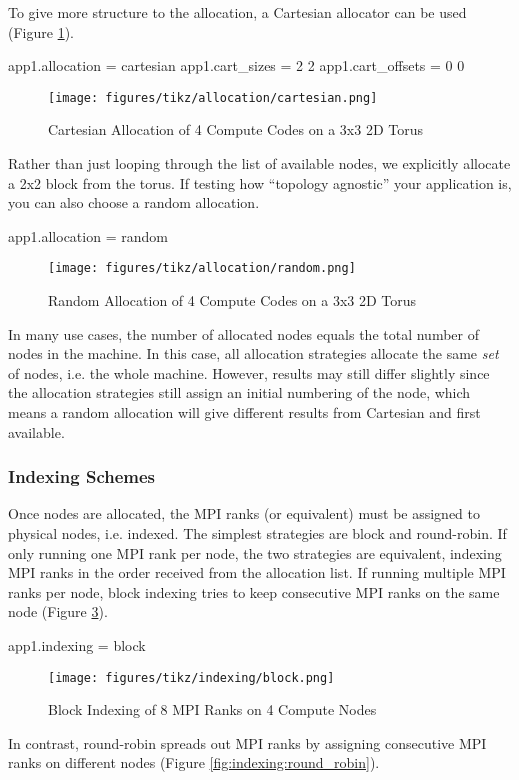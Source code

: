 To give more structure to the allocation, a Cartesian allocator can be used (Figure \ref{fig:allocation:cartesian}).

\begin{ViFile}
app1.allocation = cartesian
app1.cart_sizes = 2 2
app1.cart_offsets = 0 0
\end{ViFile}
\begin{figure}[h]
\centering
\texttt{[image: figures/tikz/allocation/cartesian.png]}
\caption{Cartesian Allocation of 4 Compute Codes on a 3x3 2D Torus}
\label{fig:allocation:cartesian}
\end{figure}
Rather than just looping through the list of available nodes, we explicitly allocate a 2x2 block from the torus.
If testing how ``topology agnostic'' your application is, you can also choose a random allocation.

\begin{ViFile}
app1.allocation = random
\end{ViFile}
\begin{figure}[h]
\centering
\texttt{[image: figures/tikz/allocation/random.png]}
\caption{Random Allocation of 4 Compute Codes on a 3x3 2D Torus}
\label{fig:allocation:random}
\end{figure}

In many use cases, the number of allocated nodes equals the total number of nodes in the machine.
In this case, all allocation strategies allocate the same \emph{set} of nodes, i.e. the whole machine.
However, results may still differ slightly since the allocation strategies still assign an initial numbering of the node,
which means a random allocation will give different results from Cartesian and first available.


\subsubsection{Indexing Schemes}
\label{subsec:tutorial:indexing}
Once nodes are allocated, the MPI ranks (or equivalent) must be assigned to physical nodes, i.e. indexed.
The simplest strategies are block and round-robin.  If only running one MPI rank per node, the two strategies are equivalent,
indexing MPI ranks in the order received from the allocation list.
If running multiple MPI ranks per node, block indexing tries to keep consecutive MPI ranks on the same node (Figure \ref{fig:indexing:block}).

\begin{ViFile}
app1.indexing = block
\end{ViFile}
\begin{figure}[h]
\centering
\texttt{[image: figures/tikz/indexing/block.png]}
\caption{Block Indexing of 8 MPI Ranks on 4 Compute Nodes}
\label{fig:indexing:block}
\end{figure}
In contrast, round-robin spreads out MPI ranks by assigning consecutive MPI ranks on different nodes (Figure \ref{fig:indexing:round_robin}).

